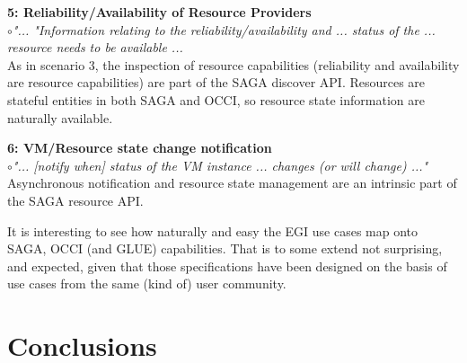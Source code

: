 \documentclass[10pt,conference,final,letterpaper,twoside,twocolumn,]{IEEEtran}
\newcommand{\I}[1]{\textit{#1}}
\newcommand{\B}[1]{\textbf{#1}}
\newcommand{\F}[1]{\B{[FIXME: #1]}}
\newcommand{\bull}{$\circ$}
\begin{document}
  \noindent
  \B{5: Reliability/Availability of Resource Providers}\\
  \bull \I{"... "Information relating to the reliability/availability 
  and ... status of the ... resource needs to be available ...}\\
  As in scenario 3, the inspection of resource capabilities
  (reliability and availability are resource capabilities) are part of
  the SAGA discover API.  Resources are stateful entities in both SAGA
  and OCCI, so resource state information are naturally available.

  \noindent
  \B{6: VM/Resource state change notification}\\
  \bull \I{"... [notify when] status of the VM instance ...
  changes (or will change) ..."}\\ 
  Asynchronous notification and resource state management are an
  intrinsic part of the SAGA resource API.

  It is interesting to see how naturally and easy the EGI use cases
  map onto SAGA, OCCI (and GLUE) capabilities.  That is to some extend
  not surprising, and expected, given that those specifications have
  been designed on the basis of use cases from the same (kind of) user
  community.




\section{Conclusions}







\end{document}
